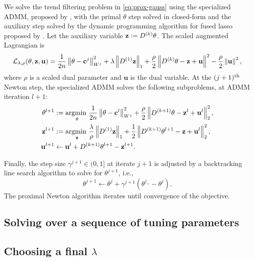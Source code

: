 We solve the trend filtering problem in \eqref{eq:prox-gauss} using the
specialized ADMM, proposed by \cite{ramdas2016fast}, with the primal $\theta$
step solved in closed-form and the auxiliary step solved by the dynamic
programming algorithm for fused lasso proposed by \cite{johnson2013dynamic}. Let
the auxiliary variable $\mathbf{z}:= D^{(k)}\theta$. The scaled augmented Lagrangian
is $$\mathcal{L}_{\lambda, \rho}(\theta, \mathbf{z}, \mathbf{u}) = \frac{1}{2n}
\left\lVert \theta - \mathbf{c}^{j} \right\rVert_{W^j}^2 + \lambda \left\lVert D^{(1)}\mathbf{z} \right\rVert_1 +
\frac{\rho}{2} \left\lVert D^{(k)}\theta - \mathbf{z} + \mathbf{u} \right\rVert^2 - \frac{\rho}{2}
\left\lVert \mathbf{u} \right\rVert^2, $$ where $\rho$ is a scaled dual parameter and $\mathbf{u}$
is the dual variable. At the $(j+1)^{\textnormal{th}}$ Newton step, the specialized ADMM
solves the following subproblems, at ADMM iteration $l+1$: 
\begin{equation}
  \begin{split}
    \theta^{l+1} &:= \underset{\theta}{\operatorname*{argmin}\ } \frac{1}{2n} \left\lVert \theta - \mathbf{c}^{l} \right\rVert_{W^j}^2 + \frac{\rho}{2} \left\lVert D^{(k+1)} \theta - \mathbf{z}^l + \mathbf{u}^l \right\rVert_2^2, \\
    \mathbf{z}^{l+1} &:= \underset{\mathbf{z}}{\operatorname*{argmin}\ } \frac{\lambda}{\rho} \left\lVert D^{(1)} \mathbf{z} \right\rVert_1 +
    \frac{1}{2} \left\lVert D^{(k+1)} \theta^{l+1} - \mathbf{z} + \mathbf{u}^l \right\rVert_2^2, \\
    \mathbf{u}^{l+1} &\leftarrow \mathbf{u}^l + D^{(k+1)} \theta^{l+1} - \mathbf{z}^{l+1}.
  \end{split}
\end{equation}

Finally, the step size $\gamma^{j+1} \in (0,1]$ at iterate $j+1$ is adjusted by a backtracking line search algorithm to solve for $\theta^{j+1}$, i.e.,   
$$\theta^{j+1} \leftarrow \theta^j + \gamma^{j+1} (\theta^{j_+} - \theta^j).$$ The proximal Newton algorithm iterates until convergence of the objective.



\subsection{Solving over a sequence of tuning parameters}


\subsection{Choosing a final $\lambda$}

